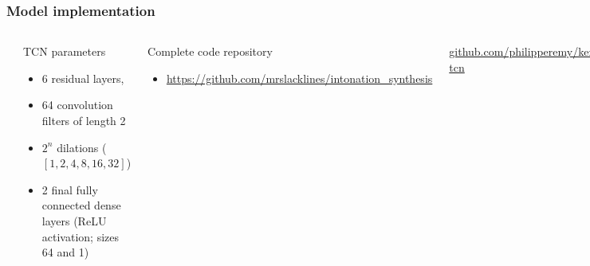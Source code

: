 \documentclass[a4paper,9pt]{beamer}
\theoremstyle{mytheoremstyle}
\begin{document}
\begin{frame}
\frametitle{Model implementation}
\begin{columns}
\begin{center}
  \includegraphics[width=\textwidth]{res/tcn}
\end{center}
\scriptsize{
\begin{exampleblock}{TCN parameters}
\begin{itemize}
\item 6 residual layers,
\item 64 convolution filters of length 2
\item $2^n$ dilations ($[1, 2, 4, 8, 16, 32]$)
\item 2 final fully connected dense layers (ReLU activation; sizes 64 and 1)
\end{itemize}
\end{exampleblock}
\begin{exampleblock}{Complete code repository}
\begin{itemize}
\item[\checkmark] \url{https://github.com/mrslacklines/intonation_synthesis}
\end{itemize}
\end{exampleblock}
\begin{block}
{}
\scriptsize{\url{github.com/philipperemy/keras-tcn}}
\end{block}
}
\end{columns}
\end{frame}
\end{document}
